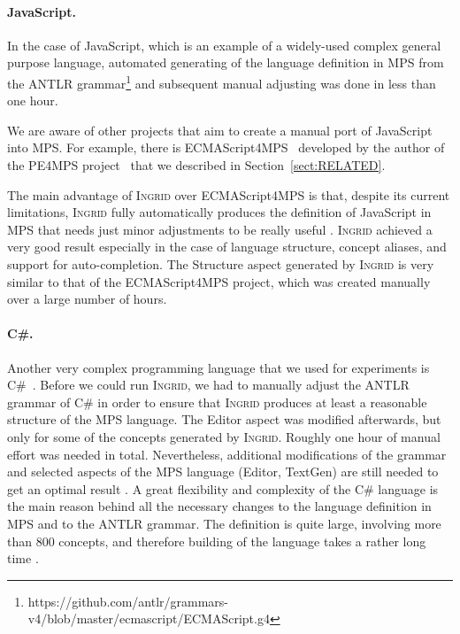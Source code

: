 \paragraph{JavaScript.}
In the case of JavaScript, which is an example of a widely-used complex general purpose language, automated generating of the language definition in MPS from the ANTLR grammar\footnote{https://github.com/antlr/grammars-v4/blob/master/ecmascript/ECMAScript.g4} and subsequent manual adjusting was done in less than one hour.

We are aware of other projects that aim to create a manual port of JavaScript into MPS.
For example, there is ECMAScript4MPS~\cite{ref:ECMA4MPS} developed by the author of the PE4MPS project~\cite{ref:PE4MPS} that we described in Section~\ref{sect:RELATED}.

The main advantage of \textsc{Ingrid} over ECMAScript4MPS is that, despite its current limitations, \textsc{Ingrid} fully automatically produces the definition of JavaScript in MPS that needs just minor adjustments to be really useful .
\textsc{Ingrid} achieved a very good result  especially in the case of language structure, concept aliases, and support for auto-completion.
The Structure aspect generated by \textsc{Ingrid} is very similar to that of the ECMAScript4MPS project, which was created manually over a large number of hours.

\paragraph{C\#.}
Another very complex programming language that we used for experiments is C\#~\cite{ref:CSHARP}.
Before we could run \textsc{Ingrid}, we had to manually adjust the ANTLR grammar of C\# in order to ensure that \textsc{Ingrid} produces at least a reasonable structure  of the MPS language.
The Editor aspect was modified afterwards, but only for some of the concepts generated by \textsc{Ingrid}. 
Roughly one hour of manual effort was needed in total.
Nevertheless, additional modifications of the grammar and selected aspects of the MPS language (Editor, TextGen) are still needed to get an optimal result .
A great flexibility and complexity of the C\# language is the main reason behind all the necessary changes to the language definition in MPS and to the ANTLR grammar.
The definition is quite large, involving more than 800 concepts, and therefore building of the language takes a rather long time .


